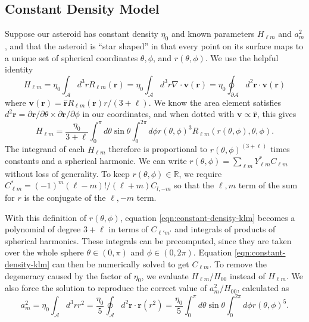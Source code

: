 \documentclass{aastex631}
\newcommand{\unit}[1]{\hat{\bm{#1}}}
\begin{document}
\subsection{Constant Density Model}
\label{sec:constant-density}
Suppose our asteroid has constant density $\eta_0$ and known parameters $H_{\ell m}$ and $a_m^2$, and that the asteroid is ``star shaped'' in that every point on its surface maps to a unique set of spherical coordinates $\theta, \phi$, and $r(\theta, \phi)$. We use the helpful identity
\begin{equation}
  H_{\ell m} = \eta_0 \int_\mathcal{A} d^3 r R_{\ell m} (\bm r)
   = \eta_0 \int_\mathcal{A} d^3 r \nabla \cdot \bm v (\bm r)
    = \eta_0 \oint_{\partial \mathcal{A}} d^2 \bm r \cdot \bm v (\bm r)
\end{equation}
where $\bm v (\bm r) = \unit r R_{\ell m} (\bm r) r / (3+\ell) $. We know the area element satisfies $d^2 \bm r = \partial \bm r / \partial \theta \times \partial \bm r / \partial \phi$ in our coordinates, and when dotted with $\bm v \propto \unit r$, this gives
\begin{equation}
  H_{\ell m} = \frac{\eta_0 }{3 + \ell} \int_0^\pi d\theta \sin \theta\int_0^{2\pi}d\phi r(\theta, \phi)^3 R_{\ell m}(r(\theta, \phi), \theta, \phi).
  \label{eqn:constant-density-klm}
\end{equation}
The integrand of each $H_{\ell m}$ therefore is proportional to $r(\theta, \phi)^{(3+\ell)}$ times constants and a spherical harmonic. We can write $r(\theta, \phi) = \sum_{\ell m} Y_{\ell m}^* C_{\ell m}$ without loss of generality.  To keep $r(\theta, \phi) \in \mathds{R}$, we require $C_{\ell m}^* = (-1)^m (\ell-m)!/(\ell+m) C_{l,-m}$ so that the $\ell, m$ term of the sum for $r$ is the conjugate of the $\ell, -m$ term.

With this definition of $r(\theta, \phi)$, equation \ref{eqn:constant-density-klm} becomes a polynomial of degree $3+\ell$ in terms of $C_{\ell' m'}$ and integrals of products of spherical harmonics. These integrals can be precomputed, since they are taken over the whole sphere $\theta \in (0, \pi)$ and $\phi \in (0, 2\pi)$. Equation \ref{eqn:constant-density-klm} can then be numerically solved to get $C_{\ell m}$. To remove the degeneracy caused by the factor of $\eta_0$, we evaluate $H_{\ell m} / H_{00}$ instead of $H_{\ell m}$. We also force the solution to reproduce the correct value of $a_m^2/H_{00}$, calculated as
\begin{equation}
  a_m^2 = \eta_0 \int_\mathcal{A} d^3 r r^2 = \frac{\eta_0}{5}\oint_\mathcal{A} d^2 \bm r \cdot \bm r(r^2) = \frac{\eta_0}{5}\int_0^\pi d\theta \sin\theta \int_0^{2\pi}d\phi r(\theta, \phi)^5.
\end{equation}
\end{document}
